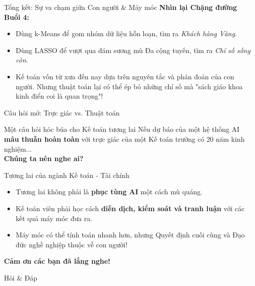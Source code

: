 \documentclass[aspectratio=169]{beamer}
\begin{document}
\begin{frame}{Tổng kết: Sự va chạm giữa Con người \& Máy móc}
    \textbf{Nhìn lại Chặng đường Buổi 4:}
    \begin{itemize}
        \item Dùng k-Means để gom nhóm dữ liệu hỗn loạn, tìm ra \textit{Khách hàng Vàng}.
        \item Dùng LASSO để vượt qua đám sương mù Đa cộng tuyến, tìm ra \textit{Chỉ số sống còn}.
        \item Kế toán vốn từ xưa đến nay dựa trên nguyên tắc và phán đoán của con người. Nhưng thuật toán lại có thể ép bỏ những chỉ số mà "sách giáo khoa kinh điển coi là quan trọng"!
    \end{itemize}
\end{frame}

\begin{frame}{Câu hỏi mở: Trực giác vs. Thuật toán}
    \begin{block}{Một câu hỏi hóc búa cho Kế toán tương lai}
        Nếu dự báo của một hệ thống AI \textbf{mâu thuẫn hoàn toàn} với trực giác của một Kế toán trưởng có 20 năm kinh nghiệm... \\
        \textbf{Chúng ta nên nghe ai?}
    \end{block}
\end{frame}

\begin{frame}{Tương lai của ngành Kế toán - Tài chính}
    \begin{itemize}
        \item Tương lai không phải là \textbf{phục tùng AI} một cách mù quáng.
        \item Kế toán viên phải học cách \textbf{diễn dịch, kiểm soát và tranh luận} với các kết quả máy móc đưa ra.
        \item Máy móc có thể tính toán nhanh hơn, nhưng Quyết định cuối cùng và Đạo đức nghề nghiệp thuộc về con người!
    \end{itemize}
\end{frame}

\begin{frame}
    \centering
    \Huge \textbf{Cảm ơn các bạn đã lắng nghe!}
    
    \vspace{0.5cm}
    \Large Hỏi \& Đáp
\end{frame}
\end{document}
